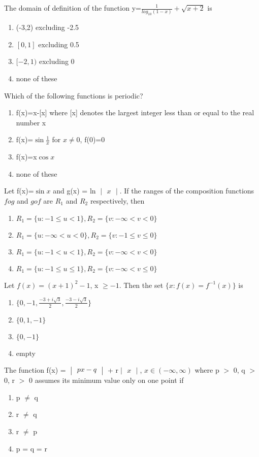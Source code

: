\item The domain of definition of the function y=$\frac{1}{log_{10}(1-x)} + \sqrt{x+2}$ is
\begin{enumerate}
\item (-3,2) excluding -2.5
\item $[0,1]$ excluding 0.5
\item $[-2,1)$ excluding 0
\item none of these
\end{enumerate}

\item Which of the following functions is periodic?
\begin{enumerate}
\item f(x)=x-[x] where [x] denotes the largest integer less than or equal to the real number x
\item f(x)=$\sin\frac{1}{x}$ for $x \neq 0$, f(0)=0
\item f(x)=x$\cos x$
\item none of these
\end{enumerate}

\item Let f(x)=$\sin x$ and g(x) = ln $\begin{vmatrix} x \end{vmatrix}$. If the ranges of the composition functions $fog$ and $gof$ are $R_{1}$ and $R_{2}$ respectively, then
\begin{enumerate}
\item $R_1 = \{u: -1 \leq u < 1\}, R_2 = \{v: -\infty < v < 0\}$
\item $R_1 = \{u: -\infty < u < 0\}, R_2 = \{v: -1 \leq v \leq 0\}$
\item $R_1 = \{u: -1 < u < 1\}, R_2 = \{v: -\infty < v < 0\}$
\item $R_1 = \{u: -1 \leq u \leq 1\}, R_2 = \{v: -\infty < v \leq 0\}$
\end{enumerate}

\item Let $f(x)=(x+1)^{2}-1$, x $\geq -1$. Then the set $\{x: f(x)= f^{-1}(x)\}$ is
\begin{enumerate}
\item $\{0,-1, \frac{-3+i\sqrt{3}}{2}, \frac{-3-i\sqrt{3}}{2}\}$
\item $\{0,1,-1\}$
\item $\{0,-1\}$
\item empty
\end{enumerate}

\item The function f(x) = $\begin{vmatrix} px-q \end{vmatrix}$ + r$\begin{vmatrix} x \end{vmatrix}$,
 $x \in (-\infty,\infty)$ where p $>$ 0, q $>$ 0, r $>$ 0 assumes its minimum value only on one point if
\begin{enumerate}
\item p $\neq$ q
\item r $\neq$ q
\item r $\neq$ p
\item p = q = r
\end{enumerate}

